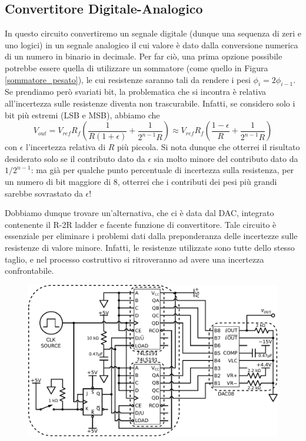 \subsection{Convertitore Digitale-Analogico}

In questo circuito convertiremo un segnale digitale (dunque una sequenza di zeri e uno logici) in un segnale analogico il cui valore è dato dalla conversione numerica di un numero in binario in decimale. Per far ciò, una prima opzione possibile potrebbe essere quella di utilizzare un sommatore (come quello in Figura \ref{sommatore_pesato}), le cui resistenze saranno tali da rendere i pesi $\phi_i = 2 \phi_{i -1}$. Se prendiamo però svariati bit, la problematica che si incontra è relativa all'incertezza sulle resistenze diventa non trascurabile. Infatti, se considero solo i bit più estremi (LSB e MSB), abbiamo che
$$V_{out}=V_{ref} R_f \left( \frac{1}{R (1 + \epsilon)} + \frac{1}{2^{n-1}R}\right) \approx V_{ref} R_f \left( \frac{1 - \epsilon}{R} + \frac{1}{2^{n-1}R}\right)$$
con $\epsilon$ l'incertezza relativa di $R$ più piccola. Si nota dunque che otterrei il risultato desiderato solo se il contributo dato da $\epsilon$ sia molto minore del contributo dato da $1/2^{n-1}$: ma già per qualche punto percentuale di incertezza sulla resistenza, per un numero di bit maggiore di 8, otterrei che i contributi dei pesi più grandi sarebbe sovrastato da $\epsilon$!

Dobbiamo dunque trovare un'alternativa, che ci è data dal DAC, integrato contenente il R-2R ladder e facente funzione di convertitore. Tale circuito è essenziale per eliminare i problemi dati dalla preponderanza delle incertezze sulle resistenze di valore minore. Infatti, le resistenze utilizzate sono tutte dello stesso taglio, e nel processo costruttivo si ritroveranno ad avere una incertezza confrontabile.

\begin{figure}[htpc]
\centering
	\includegraphics[width=.65\textwidth]{../E12/latex/DAC.pdf}
	\caption{}
	\label{cir12:dac}
\end{figure}

